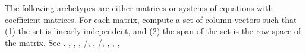 The following archetypes are either matrices or systems of equations with coefficient matrices.  For each matrix, compute a set of column vectors such that  (1) the set is linearly independent, and (2) the span of the set is the row space of the matrix.  See .\newline\newline
{},
,
,
/,
,
/,
,
,
%
,


